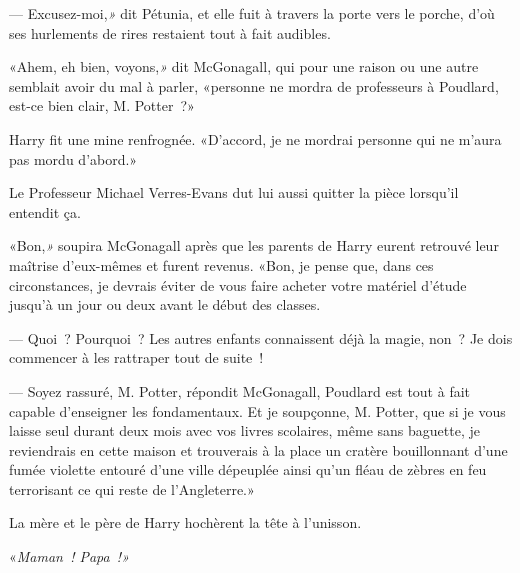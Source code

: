 --- Excusez-moi,\emph{»} dit Pétunia, et elle fuit à travers la porte vers le porche, d'où ses hurlements de rires restaient tout à fait audibles.

«Ahem, eh bien, voyons,\emph{»} dit McGonagall, qui pour une raison ou une autre semblait avoir du mal à parler, «personne ne mordra de professeurs à Poudlard, est-ce bien clair, M. Potter~?»

Harry fit une mine renfrognée. «D'accord, je ne mordrai personne qui ne m'aura pas mordu d'abord.»

Le Professeur Michael Verres-Evans dut lui aussi quitter la pièce lorsqu'il entendit ça.

«Bon,\emph{»} soupira McGonagall après que les parents de Harry eurent retrouvé leur maîtrise d'eux-mêmes et furent revenus. «Bon, je pense que, dans ces circonstances, je devrais éviter de vous faire acheter votre matériel d'étude jusqu'à un jour ou deux avant le début des classes.

--- Quoi~? Pourquoi~? Les autres enfants connaissent déjà la magie, non~? Je dois commencer à les rattraper tout de suite~!

--- Soyez rassuré, M. Potter, répondit McGonagall, Poudlard est tout à fait capable d'enseigner les fondamentaux. Et je soupçonne, M. Potter, que si je vous laisse seul durant deux mois avec vos livres scolaires, même sans baguette, je reviendrais en cette maison et trouverais à la place un cratère bouillonnant d'une fumée violette entouré d'une ville dépeuplée ainsi qu'un fléau de zèbres en feu terrorisant ce qui reste de l'Angleterre.»

La mère et le père de Harry hochèrent la tête à l'unisson.

«\emph{Maman~! Papa~!»}
